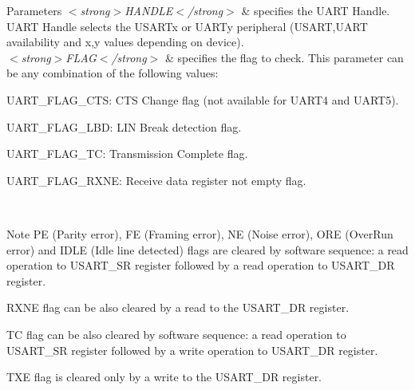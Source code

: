 \begin{DoxyParams}{Parameters}
{\em $<$strong$>$\-H\-A\-N\-D\-L\-E$<$/strong$>$} & specifies the U\-A\-R\-T Handle. U\-A\-R\-T Handle selects the U\-S\-A\-R\-Tx or U\-A\-R\-Ty peripheral (U\-S\-A\-R\-T,U\-A\-R\-T availability and x,y values depending on device). \\
\hline
{\em $<$strong$>$\-F\-L\-A\-G$<$/strong$>$} & specifies the flag to check. This parameter can be any combination of the following values\-: \begin{DoxyItemize}
\item U\-A\-R\-T\-\_\-\-F\-L\-A\-G\-\_\-\-C\-T\-S\-: C\-T\-S Change flag (not available for U\-A\-R\-T4 and U\-A\-R\-T5). \item U\-A\-R\-T\-\_\-\-F\-L\-A\-G\-\_\-\-L\-B\-D\-: L\-I\-N Break detection flag. \item U\-A\-R\-T\-\_\-\-F\-L\-A\-G\-\_\-\-T\-C\-: Transmission Complete flag. \item U\-A\-R\-T\-\_\-\-F\-L\-A\-G\-\_\-\-R\-X\-N\-E\-: Receive data register not empty flag.\end{DoxyItemize}
\\
\hline
\end{DoxyParams}
\begin{DoxyNote}{Note}
P\-E (Parity error), F\-E (Framing error), N\-E (Noise error), O\-R\-E (Over\-Run error) and I\-D\-L\-E (Idle line detected) flags are cleared by software sequence\-: a read operation to U\-S\-A\-R\-T\-\_\-\-S\-R register followed by a read operation to U\-S\-A\-R\-T\-\_\-\-D\-R register. 

R\-X\-N\-E flag can be also cleared by a read to the U\-S\-A\-R\-T\-\_\-\-D\-R register. 

T\-C flag can be also cleared by software sequence\-: a read operation to U\-S\-A\-R\-T\-\_\-\-S\-R register followed by a write operation to U\-S\-A\-R\-T\-\_\-\-D\-R register. 

T\-X\-E flag is cleared only by a write to the U\-S\-A\-R\-T\-\_\-\-D\-R register.
\end{DoxyNote}

